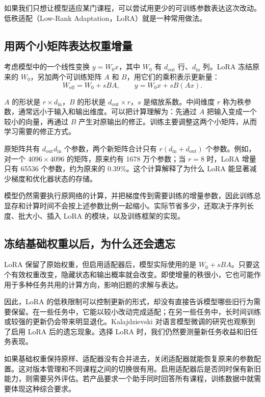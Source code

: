 如果我们只想让模型适应某门课程，可以尝试用更少的可训练参数表达这次改动。低秩适配（Low-Rank Adaptation，LoRA）就是一种常用做法。

\subsection{用两个小矩阵表达权重增量}

考虑模型中的一个线性变换 $y=W_0x$，其中 $W_0$ 有 $d_{\mathrm{out}}$ 行、$d_{\mathrm{in}}$ 列。LoRA 冻结原来的 $W_0$，另加两个可训练矩阵 $A$ 和 $B$，用它们的乘积表示更新量：
\[
W_{\mathrm{eff}}=W_0+sBA,
\qquad
y=W_0x+sB(Ax).
\]

$A$ 的形状是 $r\times d_{\mathrm{in}}$，$B$ 的形状是 $d_{\mathrm{out}}\times r$，$s$ 是缩放系数。中间维度 $r$ 称为秩参数，通常远小于输入和输出维度。可以把计算理解为：先通过 $A$ 把输入变成一个较小的向量，再通过 $B$ 产生对原输出的修正。训练主要调整这两个小矩阵，从而学习需要的修正方式。

原矩阵共有 $d_{\mathrm{out}}d_{\mathrm{in}}$ 个参数，两个新矩阵合计只有 $r(d_{\mathrm{in}}+d_{\mathrm{out}})$ 个参数。例如，对一个 $4096\times4096$ 的矩阵，原来约有 1678 万个参数；当 $r=8$ 时，LoRA 增量只有 65536 个参数，约为原来的 $0.39\%$。这个计算解释了为什么 LoRA 能显著减少梯度和优化器状态的存储。

模型仍然需要执行原网络的计算，并把梯度传到需要训练的增量参数，因此训练总显存和计算时间不会按上述参数比例一起缩小。实际节省多少，还取决于序列长度、批大小、插入 LoRA 的模块，以及训练框架的实现。

\subsection{冻结基础权重以后，为什么还会遗忘}

LoRA 保留了原始权重，但启用适配器后，模型实际使用的是 $W_0+sBA$。只要这个有效权重改变，隐藏状态和输出概率就会改变。即使增量的秩很小，它也可能作用于多种任务共用的计算方向，影响旧题的求解与表达。

因此，LoRA 的低秩限制可以控制更新的形式，却没有直接告诉模型哪些旧行为需要保留。在一些任务中，它能以较小改动完成适配；在另一些任务中，长时间训练或较强的更新仍会带来明显退化。Kalajdzievski 对语言模型微调的研究也观察到了启用 LoRA 后的遗忘现象。选择 LoRA 时，我们仍然要测量新任务收益和旧任务表现。

如果基础权重保持原样、适配器没有合并进去，关闭适配器就能恢复原来的参数配置。这对版本管理和不同课程之间的切换很有用。启用适配器后是否同时保有新旧能力，则需要另外评估。若产品要求一个助手同时回答所有课程，训练数据中就需要体现这种综合要求。

